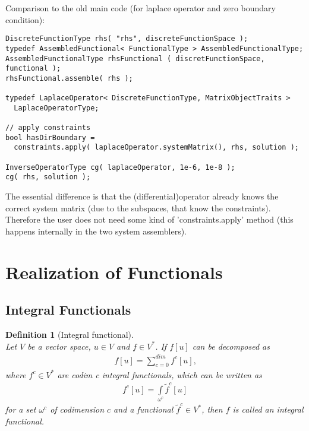 \documentclass[a4paper,11pt]{article}
\numberwithin{equation}{section}
\newtheorem{definition}{Definition}[section]
\newcommand{\theoremNewline}{\hspace{1mm}\\}
\newcommand{\theoremEndLine}{\hspace{1mm}}
\newcommand{\komma}{\text{,}}
\begin{document}
Comparison to the old main code (for laplace operator and zero boundary condition):
\begin{lstlisting}
DiscreteFunctionType rhs( "rhs", discreteFunctionSpace );
typedef AssembledFunctional< FunctionalType > AssembledFunctionalType;
AssembledFunctionalType rhsFunctional ( discretFunctionSpace, functional );
rhsFunctional.assemble( rhs );

typedef LaplaceOperator< DiscreteFunctionType, MatrixObjectTraits >
  LaplaceOperatorType;

// apply constraints
bool hasDirBoundary =
  constraints.apply( laplaceOperator.systemMatrix(), rhs, solution );

InverseOperatorType cg( laplaceOperator, 1e-6, 1e-8 );
cg( rhs, solution );
\end{lstlisting}

The essential difference is that the (differential)operator already knows the correct system matrix (due to the subspaces, that know the constraints). Therefore the user does not need some kind of 'constraints.apply' method (this happens internally in the two system assemblers).

\section{Realization of Functionals}

  \subsection{Integral Functionals}

    \begin{definition}[Integral functional]\theoremNewline
      Let $V$ be a vector space, ${u \in V}$ and ${f \in V^*}$. If $f[u]$ can
      be decomposed as
      \begin{align}
        f[u] = \sum\limits_{c = 0}^{dim}
            {
              f^c [u]
            }\komma
      \end{align}
      where ${f^c \in V^*}$ are \textnormal{codim c integral functionals}, which can be written as
      \begin{align}
        f^c [u] = \int\limits_{\omega^c} \tilde{f}^c[u]
      \end{align}
      for a set $\omega^c$ of codimension $c$ and a functional ${\tilde{f}^c \in V^*}$, then $f$ is called an
      \textnormal{integral functional}.
    \end{definition}\theoremEndLine
\end{document}

